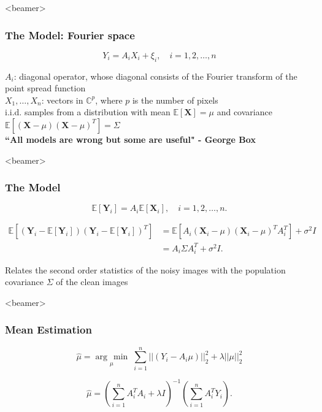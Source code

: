 \documentclass{beamer}
\newcommand{\argmin}[1]{\underset{#1}{\operatorname{arg}\,\operatorname{min}}\;}
\begin{document}
\begin{frame}<beamer>
\frametitle{The Model: Fourier space}

\begin{equation}
 Y_i = A_i X_i + \xi_i, \quad i=1,2,\ldots,n
\label{eqn:model_f}
\end{equation}

$A_i$: diagonal operator, whose
diagonal consists of the Fourier transform of the point spread function\\

$X_1,\dots,X_n$: vectors in $\mathbb{C}^p$, where $p$ is the number of pixels\\
i.i.d. samples from a distribution with mean $\mathbb{E}[\textbf{X}]=\mu$
and covariance $\mathbb{E}[(\textbf{X}-\mu)(\textbf{X}-\mu)^T]=\Sigma$\\


\textbf{\alert{``All models are wrong but some are useful" - George Box}}
\end{frame}

\begin{frame}<beamer>
\frametitle{The Model}
\begin{equation}
\mathbb{E}[\textbf{Y}_i]=A_i \mathbb{E}[\textbf{X}_i], \quad i=1,2,\ldots,n.
\label{eqn:exp_y}
\end{equation}

\begin{equation}
\begin{aligned}
\mathbb{E}[(\textbf{Y}_i-\mathbb{E}[\textbf{Y}_i])(\textbf{Y}_i-\mathbb{E}[\textbf{Y}_i])^T] 
&= \mathbb{E} [A_i(\textbf{X}_i-\mu)(\textbf{X}_i-\mu)^T A_i^T] + \sigma^2I \\
&=  A_i \Sigma A_i^T + \sigma^2I .
\end{aligned}
\label{eqn:expectation_eq}
\end{equation}

Relates the second order statistics of the noisy images with the 
population covariance $\Sigma$ of the clean images
\end{frame}



\begin{frame}<beamer>
\frametitle{Mean Estimation}

\begin{equation}
 \hat\mu = \argmin{\mu} \sum_{i=1}^n||(Y_i-A_i\mu)||_2^2 + \lambda||\mu||_2^2
\end{equation}

\begin{equation}
 \hat\mu = (\sum_{i=1}^n A_i^T A_i + \lambda I)^{-1}(\sum_{i=1}^n 
A_i^T Y_i).
\label{eq:ls_mean_sol}
\end{equation}
\end{frame}
\end{document}
